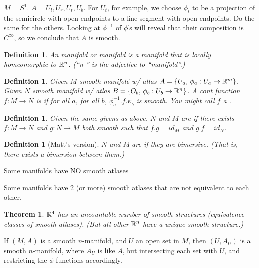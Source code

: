 \documentclass[11pt]{amsbook}
\theoremstyle{mystyle} \newtheorem{thrm}[thm]{Theorem}
\theoremstyle{mystyle} \newtheorem{defi}[thm]{Definition}
\theoremstyle{mystyle} \newtheorem{coro}[thm]{Corollary}
\theoremstyle{mystyle} \newtheorem{propo}[thm]{Proposition}
\theoremstyle{mystyle} \newtheorem{lemm}[thm]{Lemma}
\numberwithin{thm}{section}
\begin{document}
\begin{example}
	$M = S^1$.  $A = {U_l, U_r, U_t, U_b}$.  For $U_t$, for example, we choose $\phi_t$ to be a projection of the semicircle with open endpoints to a line segment with open endpoints.  Do the same for the others.  Looking at $\phi^{-1}$ of $\phi$'s will reveal that their composition is $C^\infty$, so we conclude that $A$ is smooth.
\end{example}

\begin{defi}
	An manifold or  manifold is a manifold that is locally homeomorphic to ${\mathbb R}^n$.  (``n-'' is the adjective to ``manifold''.)
\end{defi}


\begin{defi}
	Given $M$ smooth manifold w/ atlas $A = \{ U_a, \,  \phi_a : U_a \to {\mathbb R}^m \}$.
	Given $N$ smooth manifold w/ atlas $B = \{ O_b, \,  \phi_b : U_b \to {\mathbb R}^n \}$.
	A cont function $f : M \to N$ is  if for all $a$, for all $b$, $\phi_a^{-1}.f.\psi_b$ is smooth.  You might call $f$ a .
\end{defi}
\begin{defi}
	Given the same givens as above.
	$N$ and $M$ are  if there exists $f : M \to N$ and $g : N \to M$ both smooth such that $f.g = id_M$ and $g.f = id_N$.
\end{defi}
\begin{defi}[Matt's version]
	$N$ and $M$ are  if they are bimersive.  (That is, there exists a bimersion between them.)
\end{defi}

\begin{rmk}
	Some manifolds have NO smooth atlases.

	Some manifolds have 2 (or more) smooth atlases that are not equivalent to each other.
\end{rmk}


\begin{thrm}
	${\mathbb R}^4$ has an uncountable number of smooth structures (equivalence classes of smooth atlases).  (But all other ${\mathbb R}^n$ have a unique smooth structure.)
\end{thrm}

\begin{rmk}
	If $(M,A)$ is a smooth $n$-manifold, and $U$ an open set in $M$, then $(U,A_U)$ is a smooth $n$-manifold, where $A_U$ is like $A$, but intersecting each set with $U$, and restricting the $\phi$ functions accordingly.
\end{rmk}
\end{document}
